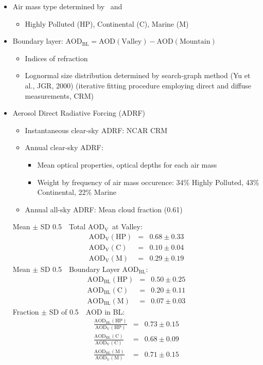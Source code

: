 \documentclass[final,dvips]{foils}
\newcommand{\pltsbs}{\ensuremath{\mathrm{HP}}} %
\newcommand{\mrnsbs}{\ensuremath{\mathrm{M}}} %
\newcommand{\ctlsbs}{\ensuremath{\mathrm{C}}} %
\newcommand{\bndsbs}{\ensuremath{\mathrm{BL}}} %
\newcommand{\vllsbs}{\ensuremath{\mathrm{V}}} %
\newcommand{\aod}{\ensuremath{\mbox{AOD}}} %
\newcommand{\aodbnd}{\ensuremath{\aod_{\bndsbs}}} %
\newcommand{\aodvll}{\ensuremath{\aod_{\vllsbs}}} %
\newcommand{\aodbndofHP}{\ensuremath{\aodbnd(\pltsbs)}} %
\newcommand{\aodbndofM}{\ensuremath{\aodbnd(\mrnsbs)}} %
\newcommand{\aodbndofC}{\ensuremath{\aodbnd(\ctlsbs)}} %
\newcommand{\aodvllofHP}{\ensuremath{\aodvll(\pltsbs)}} %
\newcommand{\aodvllofM}{\ensuremath{\aodvll(\mrnsbs)}} %
\newcommand{\aodvllofC}{\ensuremath{\aodvll(\ctlsbs)}} %
\begin{document}
\rotatefoilhead{\bgl\Large\textcolor{blue}{\hfill Methods \hfill}}\large\vspace{-0.5in} 
\enlargethispage*{1in} 
\begin{itemize}
\item Air mass type determined by \SOd\ and \NOx
\begin{itemize}
\item Highly Polluted (\pltsbs), Continental (\ctlsbs), Marine (\mrnsbs)
\end{itemize}
\item Boundary layer: $\aodbnd = \aod(\mathrm{Valley})-\aod(\mathrm{Mountain})$
\begin{itemize}
\item Indices of refraction
\item Lognormal size distribution determined by search-graph method
(Yu et al., JGR, 2000) (iterative fitting procedure employing direct
and diffuse measurements, CRM)
\end{itemize}
\item Aerosol Direct Radiative Forcing (ADRF)
\begin{itemize}
\item Instantaneous clear-sky ADRF: NCAR CRM
\item Annual clear-sky ADRF: 
\begin{itemize}
\item Mean optical properties, optical depths for each air mass
\item Weight by frequency of air mass occurence: 
34\% Highly Polluted, 43\% Continental, 22\% Marine
\end{itemize}
\item Annual all-sky ADRF: Mean cloud fraction (0.61)
\end{itemize}

\foilhead{\bgl\Large\textcolor{blue}{\hfill Results \hfill}}\large\vspace{-0.5in} 
\enlargethispage*{1in} 
Mean $\pm$ SD 0.5~\um\ Total \aodvll\ at Valley:
\begin{eqnarray}
\aodvllofHP & = & 0.68 \pm 0.33 \nonumber \\
\aodvllofC & = & 0.10 \pm 0.04 \nonumber \\
\aodvllofM & = & 0.29 \pm 0.19 \nonumber
\end{eqnarray}
Mean $\pm$ SD 0.5~\um\ Boundary Layer \aodbnd:
\begin{eqnarray}
\aodbndofHP & = & 0.50 \pm 0.25 \nonumber \\
\aodbndofC & = & 0.20 \pm 0.11 \nonumber \\
\aodbndofM & = & 0.07 \pm 0.03 \nonumber
\end{eqnarray}
Fraction $\pm$ SD of 0.5~\um\ AOD in BL:
\begin{eqnarray}
\frac{\aodbndofHP}{\aodvllofHP} & = & 0.73 \pm 0.15 \nonumber \\
\frac{\aodbndofC}{\aodvllofC} & = & 0.68 \pm 0.09 \nonumber \\
\frac{\aodbndofM}{\aodvllofM} & = & 0.71 \pm 0.15 \nonumber
\end{eqnarray}


\end{itemize}
\end{document}
